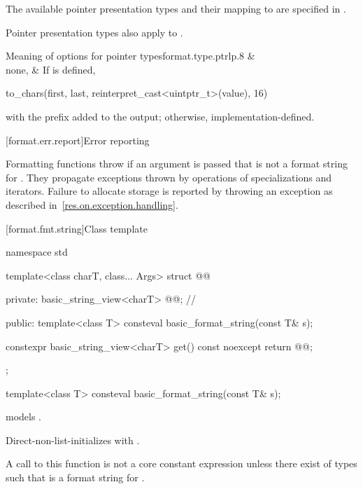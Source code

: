 \pnum
The available pointer presentation types and their mapping to
 are specified in .
\begin{note}
Pointer presentation types also apply to .
\end{note}

\begin{floattable}{Meaning of  options for pointer types}{format.type.ptr}{lp{.8\hsize}}
\topline
{} &  \\ \rowsep
none,  &
If  is defined,
\begin{codeblock}
to_chars(first, last, reinterpret_cast<uintptr_t>(value), 16)
\end{codeblock}
with the prefix  added to the output;
otherwise, implementation-defined.
\\
\end{floattable}

[format.err.report]{Error reporting}

\pnum
Formatting functions throw  if
an argument  is passed that
is not a format string for .
They propagate exceptions thrown by operations of
 specializations and iterators.
Failure to allocate storage is reported by
throwing an exception as described in~\ref{res.on.exception.handling}.

[format.fmt.string]{Class template }

\begin{codeblock}
namespace std {
  template<class charT, class... Args>
  struct @@ {
  private:
    basic_string_view<charT> @@;         // \expos

  public:
    template<class T> consteval basic_format_string(const T& s);

    constexpr basic_string_view<charT> get() const noexcept { return @@; }
  };
}
\end{codeblock}

\begin{itemdecl}
template<class T> consteval basic_format_string(const T& s);
\end{itemdecl}

\begin{itemdescr}
\pnum
\constraints
{} models .

\pnum
\effects
Direct-non-list-initializes  with .

\pnum
\remarks
A call to this function is not a core constant expression
unless there exist  of types 
such that  is a format string for .
\end{itemdescr}


